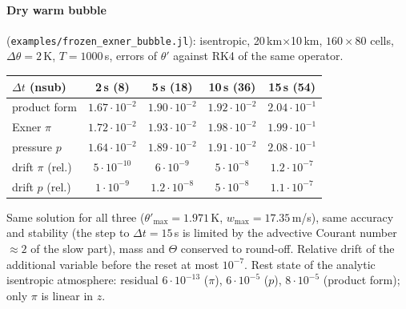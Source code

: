 \documentclass[11pt,a4paper]{article}
\newcommand{\code}[1]{\texttt{#1}}
\newcommand{\dt}{\Delta t}
\begin{document}
\paragraph{Dry warm bubble} (\code{examples/frozen\_exner\_bubble.jl}): isentropic, 20\,km$\times$10\,km,
$160\times80$ cells, $\Delta\theta=2$\,K, $T=1000$\,s, errors of $\theta'$ against RK4 of the same operator.
\begin{center}\begin{tabular}{lcccc}\toprule
$\dt$ (nsub) & 2\,s (8) & 5\,s (18) & 10\,s (36) & 15\,s (54)\\\midrule
product form & $1.67\cdot10^{-2}$ & $1.90\cdot10^{-2}$ & $1.92\cdot10^{-2}$ & $2.04\cdot10^{-1}$\\
Exner $\pi$ & $1.72\cdot10^{-2}$ & $1.93\cdot10^{-2}$ & $1.98\cdot10^{-2}$ & $1.99\cdot10^{-1}$\\
pressure $p$ & $1.64\cdot10^{-2}$ & $1.89\cdot10^{-2}$ & $1.91\cdot10^{-2}$ & $2.08\cdot10^{-1}$\\\midrule
drift $\pi$ (rel.) & $5\cdot10^{-10}$ & $6\cdot10^{-9}$ & $5\cdot10^{-8}$ & $1.2\cdot10^{-7}$\\
drift $p$ (rel.) & $1\cdot10^{-9}$ & $1.2\cdot10^{-8}$ & $5\cdot10^{-8}$ & $1.1\cdot10^{-7}$\\\bottomrule
\end{tabular}\end{center}
Same solution for all three ($\theta'_{\max}=1.971$\,K, $w_{\max}=17.35$\,m/s), same accuracy and
stability (the step to $\dt=15$\,s is limited by the advective Courant number $\approx2$ of the slow
part), mass and $\Theta$ conserved to round-off. Relative drift of the additional variable before the
reset at most $10^{-7}$. Rest state of the analytic isentropic atmosphere: residual $6\cdot10^{-13}$ ($\pi$),
$6\cdot10^{-5}$ ($p$), $8\cdot10^{-5}$ (product form); only $\pi$ is linear in $z$.
\end{document}

